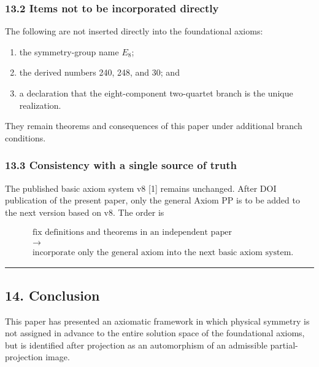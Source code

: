 \documentclass[
  a4paper,
]{article}
\providecommand{\tightlist}{%
  \setlength{\itemsep}{0pt}\setlength{\parskip}{0pt}}
\begin{document}
\subsubsection{13.2 Items not to be incorporated
directly}\label{items-not-to-be-incorporated-directly}

The following are not inserted directly into the foundational axioms:

\begin{enumerate}
\def\labelenumi{\arabic{enumi}.}
\tightlist
\item
  the symmetry-group name \(E_8\);
\item
  the derived numbers 240, 248, and 30; and
\item
  a declaration that the eight-component two-quartet branch is the
  unique realization.
\end{enumerate}

They remain theorems and consequences of this paper under additional
branch conditions.

\subsubsection{13.3 Consistency with a single source of
truth}\label{consistency-with-a-single-source-of-truth}

The published basic axiom system v8 {[}1{]} remains unchanged. After DOI
publication of the present paper, only the general Axiom PP is to be
added to the next version based on v8. The order is

\[
\begin{aligned}
&\text{fix definitions and theorems in an independent paper}\\
&\longrightarrow\\
&\text{incorporate only the general axiom into the next basic axiom system}.
\end{aligned}
\]

\begin{center}\rule{0.5\linewidth}{0.5pt}\end{center}

\subsection{14. Conclusion}\label{conclusion}

This paper has presented an axiomatic framework in which physical
symmetry is not assigned in advance to the entire solution space of the
foundational axioms, but is identified after projection as an
automorphism of an admissible partial-projection image.
\end{document}
